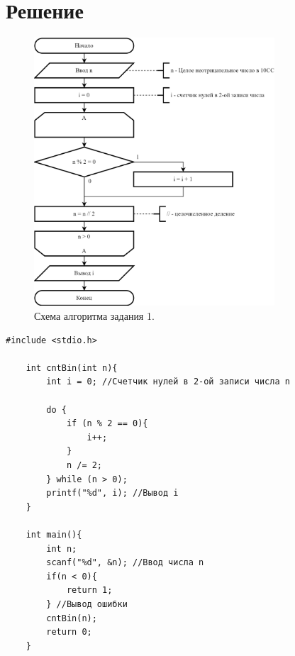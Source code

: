 \documentclass[oneside,a4paper,14pt]{extarticle} %
\begin{document}
\section*{Решение}
\begin{figure}[h!]
	\centering
	\includegraphics[width=0.8\textwidth]{pics/1-flowchart.png}
	\caption{Схема алгоритма задания 1.}
\end{figure}
\newpage
\begin{Verbatim}[fontsize=\small]
	#include <stdio.h>

	int cntBin(int n){
		int i = 0; //Счетчик нулей в 2-ой записи числа n
		
		do {
			if (n % 2 == 0){
				i++;
			}
			n /= 2;
		} while (n > 0);
		printf("%d", i); //Вывод i
	}
	
	int main(){
		int n; 
		scanf("%d", &n); //Ввод числа n
		if(n < 0){
			return 1;
		} //Вывод ошибки
		cntBin(n);
		return 0;
	}
\end{Verbatim}
\newpage
\end{document}
